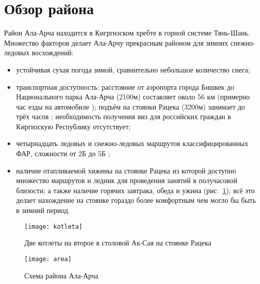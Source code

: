 \documentclass[fleqn, 10pt]{extarticle}
\begin{document}
\section{Обзор района}
	Район Ала-Арча находится в Кигргизском хребте в горной системе Тянь-Шань. Множество факторов делает Ала-Арчу прекрасным районом для зимних снежно-ледовых восхождений:
	\begin{itemize}
		\item устойчивая сухая погода зимой, сравнительно небольшое количество снега;
		\item транспортная доступность: расстояние от аэропорта города Бишкек до Национального парка Ала-Арча (2100м) составляет около 56 км (примерно час езды на автомобиле \cite{road});
			подъём на стоянки Рацека (3200м) занимает до трёх часов \cite{risk}; необходимость получения виз для российских граждан в Киргизскую Республику отсутствует;
		\item четырнадцать ледовых и снежно-ледовых маршрутов классифицированных ФАР, сложности от 2Б до 5Б \cite{alpfederation};
		\item наличие отапливаемой хижины на стоянке Рацека из которой доступно множество маршрутов и ледник для проведения занятий в получасовой близости; 
			а также наличие горячих завтрака, обеда и ужина (рис.~\ref{kotleta}); всё это делает нахождение на стоянке гораздо более комфортным чем могло бы быть в зимний период.
	\end{itemize}
	\begin{figure}[h]
		\centering
		\texttt{[image: kotleta]}
		\caption{Две котлеты на второе в столовой Ак-Сая на стоянке Рацека}\label{kotleta}
	\end{figure}
	\begin{figure}[H]
		\centering
		\texttt{[image: area]}
		\caption{Схема района Ала-Арча \cite{uvk}}\label{area}
	\end{figure}
\FloatBarrier
\end{document}
